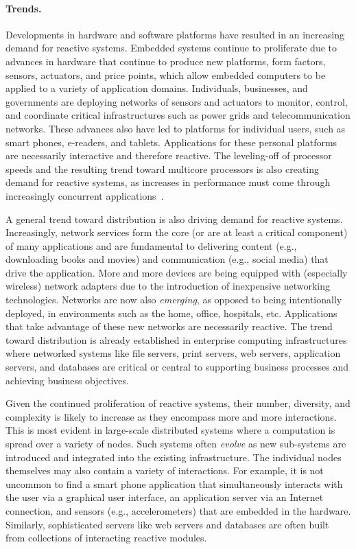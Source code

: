 \paragraph{Trends.}
Developments in hardware and software platforms have resulted in an increasing demand for reactive systems.
Embedded systems continue to proliferate due to advances in hardware that continue to produce new platforms, form factors, sensors, actuators, and price points, which allow embedded computers to be applied to a variety of application domains.
Individuals, businesses, and governments are deploying networks of sensors and actuators to monitor, control, and coordinate critical infrastructures such as power grids and telecommunication networks.
These advances also have led to platforms for individual users, such as smart phones, e-readers, and tablets.
Applications for these personal platforms are necessarily interactive and therefore reactive.
The leveling-off of processor speeds and the resulting trend toward multicore processors is also creating demand for reactive systems, as increases in performance must come through increasingly concurrent applications~\cite{sutter2005software}.

A general trend toward distribution is also driving demand for reactive systems.
Increasingly, network services form the core (or are at least a critical component) of many applications and are fundamental to delivering content (e.g., downloading books and movies) and communication (e.g., social media) that drive the application.
More and more devices are being equipped with (especially wireless) network adapters due to the introduction of inexpensive networking technologies.
Networks are now also \emph{emerging}, as opposed to being intentionally deployed, in environments such as the home, office, hospitals, etc.
Applications that take advantage of these new networks are necessarily reactive.
The trend toward distribution is already established in enterprise computing infrastructures where networked systems like file servers, print servers, web servers, application servers, and databases are critical or central to supporting business processes and achieving business objectives.

Given the continued proliferation of reactive systems, their number, diversity, and complexity is likely to increase as they encompass more and more interactions.
This is most evident in large-scale distributed systems where a computation is spread over a variety of nodes.
Such systems often \emph{evolve} as new sub-systems are introduced and integrated into the existing infrastructure.
The individual nodes themselves may also contain a variety of interactions.
For example, it is not uncommon to find a smart phone application that simultaneously interacts with the user via a graphical user interface, an application server via an Internet connection, and sensors (e.g., accelerometers) that are embedded in the hardware.
Similarly, sophisticated servers like web servers and databases are often built from collections of interacting reactive modules.

